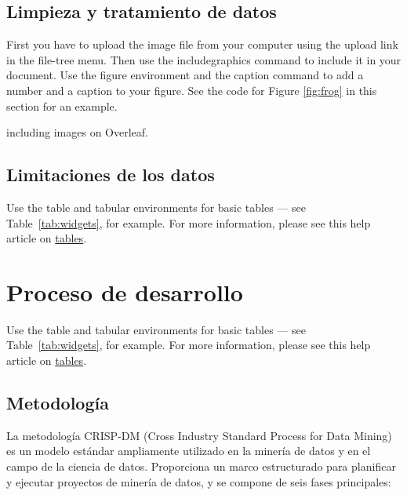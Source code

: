 \documentclass{article}
\begin{document}
\subsection{Limpieza y tratamiento de datos}

First you have to upload the image file from your computer using the upload link in the file-tree menu. Then use the includegraphics command to include it in your document. Use the figure environment and the caption command to add a number and a caption to your figure. See the code for Figure \ref{fig:frog} in this section for an example.

{including images on Overleaf}.

\subsection{Limitaciones de los datos}

Use the table and tabular environments for basic tables --- see Table~\ref{tab:widgets}, for example. For more information, please see this help article on \href{https://www.overleaf.com/learn/latex/tables}{tables}. 

\section{Proceso de desarrollo}

Use the table and tabular environments for basic tables --- see Table~\ref{tab:widgets}, for example. For more information, please see this help article on \href{https://www.overleaf.com/learn/latex/tables}{tables}. 

\subsection{Metodología}

La metodología CRISP-DM (Cross Industry Standard Process for Data Mining) es un modelo estándar ampliamente utilizado en la minería de datos y en el campo de la ciencia de datos. Proporciona un marco estructurado para planificar y ejecutar proyectos de minería de datos, y se compone de seis fases principales:
\end{document}
